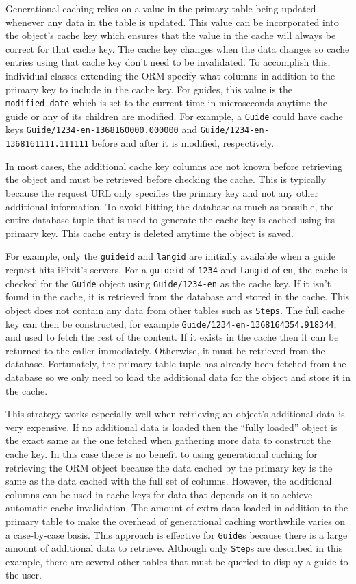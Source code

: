 \documentclass[12pt]{ucthesis}
\begin{document}
Generational caching relies on a value in the primary table being updated whenever any data in the table is updated.
This value can be incorporated into the object's cache key which ensures that the value in the cache will always be correct for that cache key.
The cache key changes when the data changes so cache entries using that cache key don't need to be invalidated.
To accomplish this, individual classes extending the ORM specify what columns in addition to the primary key to include in the cache key.
For guides, this value is the {\tt modified\_date} which is set to the current time in microseconds anytime the guide or any of its children are modified.
For example, a {\tt Guide} could have cache keys {\tt Guide/1234-en-1368160000.000000} and {\tt Guide/1234-en-1368161111.111111} before and after it is modified, respectively.

In most cases, the additional cache key columns are not known before retrieving the object and must be retrieved before checking the cache.
This is typically because the request URL only specifies the primary key and not any other additional information.
To avoid hitting the database as much as possible, the entire database tuple that is used to generate the cache key is cached using its primary key.
This cache entry is deleted anytime the object is saved.

For example, only the {\tt guideid} and {\tt langid} are initially available when a guide request hits \textsf{iFixit}'s servers.
For a {\tt guideid} of {\tt 1234} and {\tt langid} of {\tt en}, the cache is checked for the {\tt Guide} object using {\tt Guide/1234-en} as the cache key.
If it isn't found in the cache, it is retrieved from the database and stored in the cache.
This object does not contain any data from other tables such as {\tt Steps}.
The full cache key can then be constructed, for example {\tt Guide/1234-en-1368164354.918344}, and used to fetch the rest of the content.
If it exists in the cache then it can be returned to the caller immediately.
Otherwise, it must be retrieved from the database.
Fortunately, the primary table tuple has already been fetched from the database so we only need to load the additional data for the object and store it in the cache.

This strategy works especially well when retrieving an object's additional data is very expensive.
If no additional data is loaded then the ``fully loaded'' object is the exact same as the one fetched when gathering more data to construct the cache key.
In this case there is no benefit to using generational caching for retrieving the ORM object because the data cached by the primary key is the same as the data cached with the full set of columns.
However, the additional columns can be used in cache keys for data that depends on it to achieve automatic cache invalidation.
The amount of extra data loaded in addition to the primary table to make the overhead of generational caching worthwhile varies on a case-by-case basis.
This approach is effective for {\tt Guide}s because there is a large amount of additional data to retrieve.
Although only {\tt Step}s are described in this example, there are several other tables that must be queried to display a guide to the user.
\end{document}
